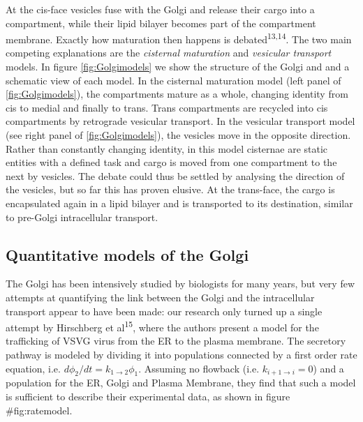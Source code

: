 \documentclass{Dissertate}
\begin{document}
At the cis-face vesicles fuse with the Golgi and release their cargo
into a compartment, while their lipid bilayer becomes part of the
compartment membrane. Exactly how maturation then happens is debated\textsuperscript{13,14}. The two main competing
explanations are the \emph{cisternal maturation} and \emph{vesicular
transport} models. In figure \ref{fig:Golgimodels} we show the
structure of the Golgi and and a schematic view of each model. In the
cisternal maturation model (left panel of \ref{fig:Golgimodels}),
the compartments mature as a whole, changing identity from cis to medial
and finally to trans. Trans compartments are recycled into cis
compartments by retrograde vesicular transport. In the vesicular
transport model (see right panel of \ref{fig:Golgimodels}), the
vesicles move in the opposite direction. Rather than constantly changing
identity, in this model cisternae are static entities with a defined
task and cargo is moved from one compartment to the next by vesicles.
The debate could thus be settled by analysing the direction of the
vesicles, but so far this has proven elusive. At the trans-face, the cargo is encapsulated again in a lipid bilayer
and is transported to its destination, similar to pre-Golgi
intracellular transport.


\hypertarget{quantitative-models-of-the-Golgi}{%
\subsection{Quantitative models of the
Golgi}\label{quantitative-models-of-the-Golgi}}

The Golgi has been intensively studied by biologists for many years, but
very few attempts at quantifying the link between the Golgi and the intracellular transport appear to have been made: our
research only turned up a single attempt by Hirschberg et
al\textsuperscript{15}, where the authors present a model for the
trafficking of VSVG virus from the ER to the plasma membrane. The
secretory pathway is modeled by dividing it into populations connected
by a first order rate equation, i.e.
\(d \phi_{2}/dt=k_{1\to2}\phi_{1}\). Assuming no flowback (i.e.
\(k_{i+1\to i}=0\)) and a population for the ER, Golgi and Plasma
Membrane, they find that such a model is sufficient to describe their
experimental data, as shown in figure \#fig:ratemodel.
\end{document}
